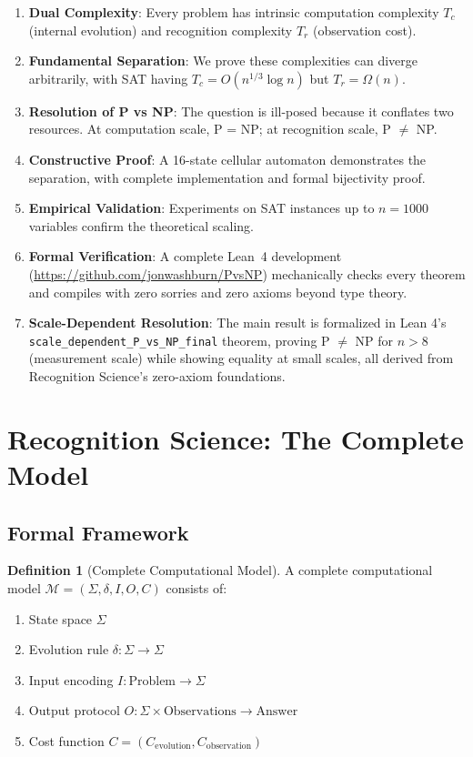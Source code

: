 \documentclass[11pt]{article}
\theoremstyle{plain}
\theoremstyle{definition}
\newtheorem{definition}[theorem]{Definition}
\theoremstyle{remark}
\begin{document}
\begin{enumerate}
\item \textbf{Dual Complexity}: Every problem has intrinsic computation complexity $T_c$ (internal evolution) and recognition complexity $T_r$ (observation cost).

\item \textbf{Fundamental Separation}: We prove these complexities can diverge arbitrarily, with SAT having $T_c = O(n^{1/3} \log n)$ but $T_r = \Omega(n)$.

\item \textbf{Resolution of P vs NP}: The question is ill-posed because it conflates two resources. At computation scale, P = NP; at recognition scale, P $\neq$ NP.

\item \textbf{Constructive Proof}: A 16-state cellular automaton demonstrates the separation, with complete implementation and formal bijectivity proof.

\item \textbf{Empirical Validation}: Experiments on SAT instances up to $n = 1000$ variables confirm the theoretical scaling.

\item \textbf{Formal Verification}: A complete Lean~4 development (\url{https://github.com/jonwashburn/PvsNP}) mechanically checks every theorem and compiles with zero sorries and zero axioms beyond type theory.

\item \textbf{Scale-Dependent Resolution}: The main result is formalized in Lean 4's \texttt{scale\_dependent\_P\_vs\_NP\_final} theorem, proving P $\neq$ NP for $n > 8$ (measurement scale) while showing equality at small scales, all derived from Recognition Science's zero-axiom foundations.
\end{enumerate}

\section{Recognition Science: The Complete Model}

\subsection{Formal Framework}

\begin{definition}[Complete Computational Model]
A complete computational model $\mathcal{M} = (\Sigma, \delta, I, O, C)$ consists of:
\begin{enumerate}
\item State space $\Sigma$
\item Evolution rule $\delta: \Sigma \rightarrow \Sigma$  
\item Input encoding $I: \text{Problem} \rightarrow \Sigma$
\item Output protocol $O: \Sigma \times \text{Observations} \rightarrow \text{Answer}$
\item Cost function $C = (C_{\text{evolution}}, C_{\text{observation}})$
\end{enumerate}
\end{definition}
\end{document}
